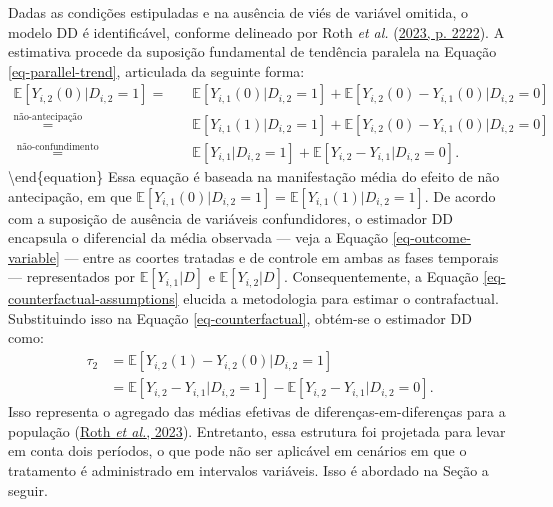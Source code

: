 \documentclass[12pt, a4paper, twoside]{article}
\numberwithin{equation}{subsection} %
\begin{document}
Dadas as condições estipuladas e na ausência de viés de variável
omitida, o modelo DD é identificável, conforme delineado por Roth
\emph{et al.} (\protect\hyperlink{ref-roth_whats_2023}{2023, p. 2222}).
A estimativa procede da suposição fundamental de tendência paralela na
Equação \eqref{eq-parallel-trend}, articulada da seguinte forma:
\begin{equation}
\label{eq-counterfactual-assumptions}
\begin{split}
    \mathbb{E}[Y_{i,2}(0) | D_{i,2} = 1] = & \quad \mathbb{E}[Y_{i,1}(0) | D_{i,2} = 1] + \mathbb{E}[Y_{i,2}(0) - Y_{i,1}(0) | D_{i,2} = 0] \\
    \stackrel{\text{não-antecipação}}{=} & \quad \mathbb{E}[Y_{i,1}(1) | D_{i,2} = 1] + \mathbb{E}[Y_{i,2}(0) - Y_{i,1}(0) | D_{i,2} = 0] \\\
    \stackrel{\text{não-confundimento}}{=} & \quad \mathbb{E}[Y_{i,1} | D_{i,2} = 1] + \mathbb{E}[Y_{i,2} - Y_{i,1} | D_{i,2} = 0].
\end{split}
\end{equation}\textbackslash end\{equation\} Essa equação é baseada na
manifestação média do efeito de não antecipação, em que
\(\mathbb{E}[Y_{i,1}(0) | D_{i,2} = 1] = \mathbb{E}[Y_{i,1}(1) | D_{i,2} = 1]\).
De acordo com a suposição de ausência de variáveis confundidores, o
estimador DD encapsula o diferencial da média observada --- veja a
Equação \eqref{eq-outcome-variable} --- entre as coortes tratadas e de
controle em ambas as fases temporais --- representados por
\(\mathbb{E}[Y_{i,1}|D]\) e \(\mathbb{E}[Y_{i,2}|D]\). Consequentemente,
a Equação \eqref{eq-counterfactual-assumptions} elucida a metodologia
para estimar o contrafactual. Substituindo isso na Equação
\eqref{eq-counterfactual}, obtém-se o estimador DD como:
\begin{equation} \label{eq-did-estimator}
\begin{split}
    \tau_2 & = \mathbb{E}[Y_{i,2}(1) - Y_{i,2}(0) | D_{i,2} = 1] \\
     & = \mathbb{E}[Y_{i,2} - Y_{i,1}| D_{i,2} = 1] - \mathbb{E}[Y_{i,2} - Y_{i,1} | D_{i,2} = 0].
\end{split}
\end{equation} Isso representa o agregado das médias efetivas de
diferenças-em-diferenças para a população
(\protect\hyperlink{ref-roth_whats_2023}{Roth \emph{et al.}, 2023}).
Entretanto, essa estrutura foi projetada para levar em conta dois
períodos, o que pode não ser aplicável em cenários em que o tratamento é
administrado em intervalos variáveis. Isso é abordado na Seção a seguir.
\end{document}
